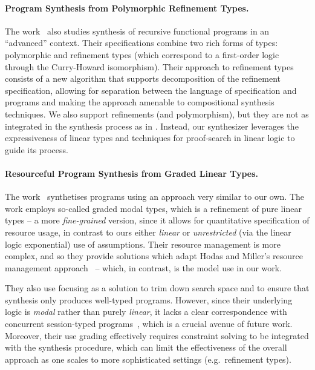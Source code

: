 \documentclass{llncs}
\newcommand{\mypara}[1]{\paragraph{\textbf{#1}.}}
\begin{document}
  
\mypara{Program Synthesis from Polymorphic Refinement Types} The
work~\cite{DBLP:conf/pldi/PolikarpovaKS16} also studies synthesis of recursive
functional programs in an ``advanced'' context. Their specifications combine two
rich forms of types: polymorphic and refinement types (which correspond to a
first-order logic through the Curry-Howard isomorphism). Their approach to
refinement types consists of a new algorithm that supports decomposition of the
refinement specification, allowing for separation between the language of
specification and programs and making the approach amenable to compositional
synthesis techniques. We also support refinements (and polymorphism),
but they are not as integrated in the synthesis process as in \cite{DBLP:conf/pldi/PolikarpovaKS16}.
Instead, our synthesizer leverages the expressiveness of linear
types and techniques for proof-search in linear logic to guide its process.

\mypara{Resourceful Program Synthesis from Graded Linear Types} The
work~\cite{DBLP:conf/lopstr/HughesO20} synthetises programs using an
approach very similar to our own.  The work employs so-called graded
modal types, which is a refinement of pure linear types -- a more
\emph{fine-grained} version, since it allows for quantitative
specification of resource usage, in contrast to ours either
\emph{linear} or \emph{unrestricted} (via the linear logic
exponential) use of assumptions.  Their resource management is more
complex, and so they provide solutions which adapt Hodas and Miller's
resource management
approach~\cite{DBLP:journals/tcs/CervesatoHP00,DBLP:journals/tcs/LiangM09}
-- which, in contrast, is the model use in our work.

They also use focusing as a solution to trim down search space and to
ensure that synthesis only produces well-typed programs. However, since their
underlying logic is \emph{modal} rather than purely \emph{linear}, it
lacks a clear correspondence with concurrent session-typed
programs~\cite{DBLP:journals/mscs/CairesPT16,DBLP:conf/concur/CairesP10},
which is a crucial avenue of future work. Moreover, their use grading
effectively requires constraint solving to be integrated with the
synthesis procedure, which can limit the effectiveness of the overall
approach as one scales to more sophisticated settings (e.g.~refinement
types).

\end{document}
